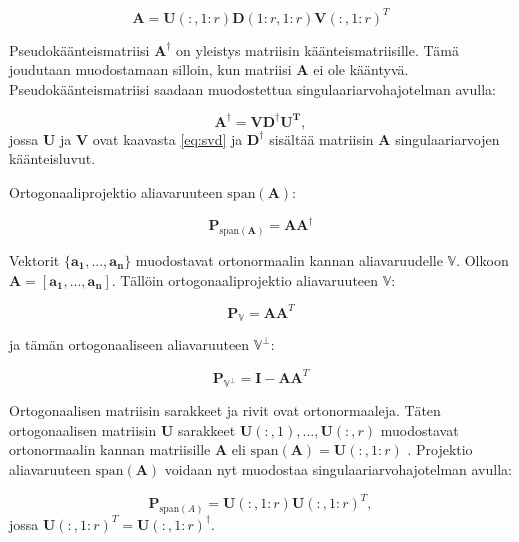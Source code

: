 \begin{equation}
    \mathbf{A} = \mathbf{U}(:,1:r)\mathbf{D}(1:r,1:r)\mathbf{V}(:,1:r)^T
    \label{eq:2}
\end{equation}


Pseudokäänteismatriisi $\mathbf{A^{\dagger}}$ on yleistys matriisin käänteismatriisille. Tämä joudutaan muodostamaan silloin, kun matriisi $\mathbf{A}$ ei ole kääntyvä. Pseudokäänteismatriisi saadaan muodostettua singulaariarvohajotelman avulla:

\begin{equation}
    \mathbf{A^{\dagger} = VD^{\dagger}U^T},
\end{equation}
jossa \textbf{U} ja \textbf{V} ovat kaavasta \ref{eq:svd} ja $\mathbf{D}^{\dagger}$ sisältää matriisin \textbf{A} singulaariarvojen käänteisluvut.

Ortogonaaliprojektio aliavaruuteen $\text{span}(\mathbf{A})$: 

\begin{equation}
    \mathbf{P}_{\text{span}(\mathbf{A})}= \mathbf{AA}^{\dagger}
\end{equation}

Vektorit $\{\mathbf{a_1,...,a_n}\}$ muodostavat ortonormaalin kannan aliavaruudelle $\mathbb{V}$. Olkoon $\mathbf{A = [\mathbf{a_1,...,a_n}]}$. Tällöin ortogonaaliprojektio aliavaruuteen $\mathbb{V}$:

\begin{equation}
    \mathbf{P}_{\mathbb{V}} = \mathbf{AA}^T
\end{equation}

ja tämän ortogonaaliseen aliavaruuteen $\mathbb{V}^{\bot}$:

\begin{equation}
    \mathbf{P}_{\mathbb{V}^{\bot}}=\mathbf{I}-\mathbf{AA}^T
\end{equation}

Ortogonaalisen matriisin sarakkeet ja rivit ovat ortonormaaleja. Täten ortogonaalisen matriisin \textbf{U} sarakkeet $\mathbf{U}(:,1),...,\mathbf{U}(:,r)$ muodostavat ortonormaalin kannan matriisille \textbf{A} eli $\text{span}(\mathbf{A}) = \mathbf{U}(:,1:r)$ \citep{Uusitalo1997Signal-spaceComponents}. Projektio aliavaruuteen $\text{span}(\mathbf{A})$ voidaan nyt muodostaa singulaariarvohajotelman avulla:

\begin{equation}
    \mathbf{P}_{\text{span}(A)} = \mathbf{U}(:,1:r)\mathbf{U}(:,1:r)^T,
    \label{eq:projektio}
\end{equation}
jossa $\mathbf{U}(:,1:r)^T = \mathbf{U}(:,1:r)^{\dagger}$.
